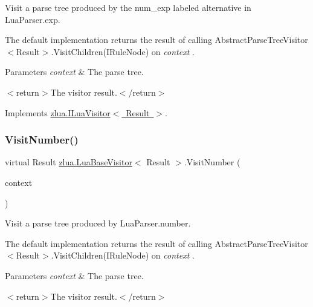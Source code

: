Visit a parse tree produced by the {\ttfamily num\+\_\+exp} labeled alternative in Lua\+Parser.\+exp. 

The default implementation returns the result of calling Abstract\+Parse\+Tree\+Visitor$<$\+Result$>$.\+Visit\+Children(\+I\+Rule\+Node) on {\itshape context} . 


\begin{DoxyParams}{Parameters}
{\em context} & The parse tree.\\
\hline
\end{DoxyParams}
$<$return$>$The visitor result.$<$/return$>$ 

Implements \mbox{\hyperlink{interfacezlua_1_1_i_lua_visitor_a03c4e65421aa19e91ebfa0f97dd31f82}{zlua.\+I\+Lua\+Visitor$<$ Result $>$}}.

\mbox{\label{classzlua_1_1_lua_base_visitor_af808d09387cef068a139c278c3ab4958}} 
\subsubsection{\texorpdfstring{Visit\+Number()}{VisitNumber()}}
{\footnotesize\ttfamily virtual Result \mbox{\hyperlink{classzlua_1_1_lua_base_visitor}{zlua.\+Lua\+Base\+Visitor}}$<$ Result $>$.Visit\+Number (\begin{DoxyParamCaption}\item[{\mbox{[}\+Not\+Null\mbox{]} \mbox{\hyperlink{classzlua_1_1_lua_parser_1_1_number_context}{Lua\+Parser.\+Number\+Context}}}]{context }\end{DoxyParamCaption})\hspace{0.3cm}{\ttfamily [virtual]}}



Visit a parse tree produced by Lua\+Parser.\+number. 

The default implementation returns the result of calling Abstract\+Parse\+Tree\+Visitor$<$\+Result$>$.\+Visit\+Children(\+I\+Rule\+Node) on {\itshape context} . 


\begin{DoxyParams}{Parameters}
{\em context} & The parse tree.\\
\hline
\end{DoxyParams}
$<$return$>$The visitor result.$<$/return$>$ 

